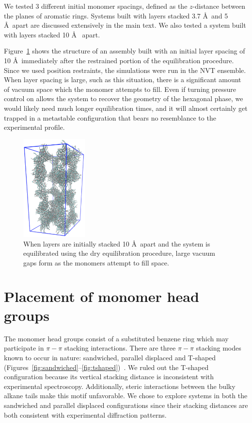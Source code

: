 \documentclass{article}
\begin{document}
  We tested 3 different initial monomer spacings, defined as the $z$-distance
  between the planes of aromatic rings. Systems built with layers
  stacked 3.7 \AA~and 5 \AA~apart are discussed extensively in the main text. We
  also tested a system built with layers stacked 10 \AA~ apart.

  Figure~\ref{fig:dbwl_10} shows the structure of an assembly built
  with an initial layer spacing of 10 \AA~immediately after the restrained
  portion of the equilibration procedure. Since we used position restraints, the
  simulations were run in the NVT ensemble. When layer spacing is large, such as
  this situation, there is a significant amount of vacuum space which the monomer
  attempts to fill. Even if turning pressure control on allows the system to
  recover the geometry of the hexagonal phase, we would likely need much longer
  equilibration times, and it will almost certainly get trapped in a metastable
  configuration that bears no resemblance to the experimental profile. 
 
  \begin{figure}[!htb]
	\centering
	\includegraphics[width=0.3\textwidth]{dbwl_10.png}
	\caption{When layers are initially stacked 10 \AA~apart and the system
                is equilibrated using the dry equilibration procedure, large vacuum gaps
	form as the monomers attempt to fill space.}\label{fig:dbwl_10} 
  \end{figure}

  \clearpage
  \section{Placement of monomer head groups}
  
  The monomer head groups consist of a substituted benzene ring which may participate in
  $\pi-\pi$ stacking interactions. There are three $\pi-\pi$ stacking modes known
  to occur in nature: sandwiched, parallel displaced and T-shaped
  (Figures~\ref{fig:sandwiched}--\ref{fig:tshaped})~\cite{sinnokrot_estimates_2002}.
  We ruled out the T-shaped configuration because its vertical stacking distance is
  inconsistent with experimental spectroscopy. Additionally, steric interactions
  between the bulky alkane tails make this motif unfavorable. We chose to explore
  systems in both the sandwiched and parallel displaced configurations since their
  stacking distances are both consistent with experimental diffraction patterns.
  
\end{document}
